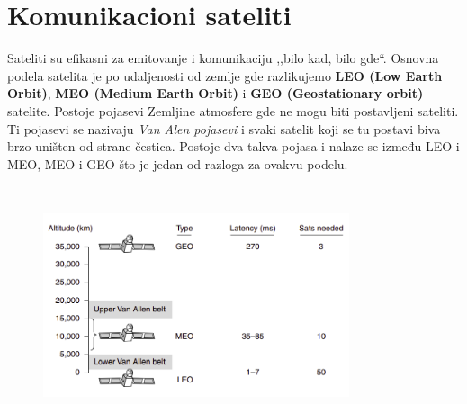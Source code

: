 \documentclass[a4paper]{article}
\begin{document}
\section{Komunikacioni sateliti}
        Sateliti su efikasni za emitovanje i komunikaciju ,,bilo kad, bilo gde``. Osnovna podela
        satelita je po udaljenosti od zemlje gde razlikujemo \textbf{LEO (Low Earth Orbit)}, 
        \textbf{MEO (Medium Earth Orbit)} i \textbf{GEO (Geostationary orbit)} satelite. Postoje
        pojasevi Zemljine atmosfere gde ne mogu biti postavljeni sateliti. Ti pojasevi se nazivaju
        \textit{Van Alen pojasevi} i svaki satelit koji se tu postavi biva brzo uništen od strane čestica.
        Postoje dva takva pojasa i nalaze se između LEO i MEO, MEO i GEO što je jedan od 
        razloga za ovakvu podelu.
        \begin{figure}[H]
            \begin{center}
                \includegraphics[width=90mm,height=70mm]{Slike/sateliti.png}
            \end{center}
        \end{figure}
\end{document}
